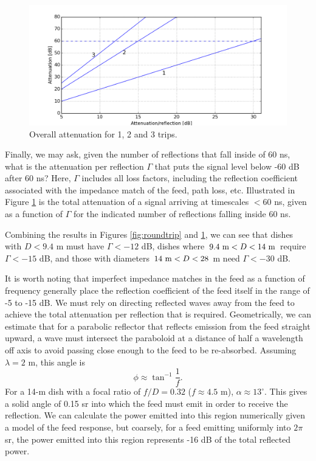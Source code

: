 \documentclass[11pt]{article}
\begin{document}
\begin{figure}[h]
\centering
\includegraphics[width=1.0\textwidth]{bounces.png}
\caption{Overall attenuation for 1, 2 and 3 trips.
} \label{fig:bounces}
\end{figure}

Finally, we may ask, given the number of reflections that fall inside of 60 ns,
what is the attenuation per reflection $\Gamma$ that puts the signal level below
-60 dB after 60 ns?  Here, $\Gamma$ includes all loss factors, including the 
reflection coefficient associated with the impedance match of the feed,
path loss, etc.  Illustrated in Figure \ref{fig:bounces} is the total attenuation 
of a signal arriving at timescales $<$60 ns,
given as a function of $\Gamma$ for the indicated number of reflections falling
inside 60 ns.

Combining the results in Figures \ref{fig:roundtrip} and \ref{fig:bounces},
we can see that dishes with $D<9.4$ m must have $\Gamma<-12$ dB, dishes
where $9.4~{\rm m}<D<14~{\rm m}$ require $\Gamma<-15$ dB, and those with
diameters $14~{\rm m}<D<28$ m need $\Gamma<-30$ dB.

It is worth noting that imperfect impedance matches in the feed as a function
of frequency generally place the reflection coefficient of the feed itself
in the range of -5 to -15 dB. We must rely on directing reflected
waves away from the feed to achieve the total attenuation per reflection
that is required.  Geometrically, we can estimate that for a parabolic reflector that
reflects emission from the feed straight upward, a wave must intersect the paraboloid
at a distance of half a wavelength off axis to avoid
passing close enough to the feed to be re-absorbed.  Assuming $\lambda=2$ m, this angle is 
\begin{equation}
\phi\approx\tan^{-1}\frac{1}{f}.
\end{equation}
For a 14-m dish with a focal ratio of $f/D=0.32$ ($f\approx4.5$ m), $\alpha\approx13^\circ$.
This gives a solid angle of 0.15 sr into which the feed must emit in order to receive the reflection.
We can calculate the power emitted into this region numerically given a model of the feed response,
but coarsely, for a feed emitting uniformly into $2\pi$ sr, the power emitted into this region
represents -16 dB of the total reflected power.  
\end{document}
